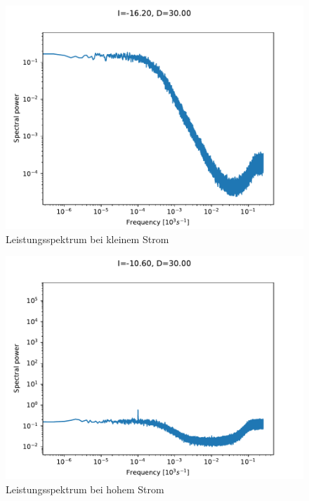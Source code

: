 \documentclass[12pt,a4paper]{article}
\begin{document}
\begin{figure}[H]
\centering
\includegraphics[scale=1]{fourd3small.pdf}\caption{Leistungsspektrum bei kleinem Strom}
\label{fourd3s}
\end{figure}
\begin{figure}[H]
	\centering
	\includegraphics[scale=1]{fourd3large.pdf}\caption{Leistungsspektrum bei hohem Strom}
	\label{fourd3h}
\end{figure}
\end{document}
